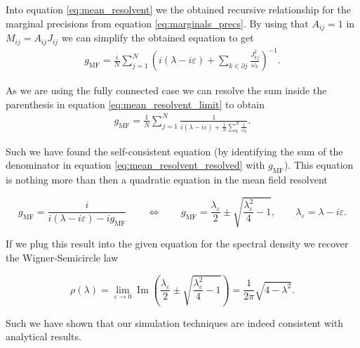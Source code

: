 \documentclass[../main.tex]{subfiles}
\begin{document}
Into equation \eqref{eq:mean_resolvent} we the obtained recursive relationship for the marginal precisions from equation \eqref{eq:marginals_precs}.
By using that $A_{ ij } = 1$ in $M_{ ij } = A_{ ij } J_{ ij } $ we can simplify the obtained equation to get 
\begin{align}
    \label{eq:mean_resolvent_limit}
    g_{ \text{MF} }  = \frac{i}{N} \sum_{j=1}^{N} \left( i(\lambda - i \varepsilon) + \sum_{k \in \partial j}^{} \frac{J^2_{ kj }}{\omega_k} \right)^{-1}
.\end{align}

As we are using the fully connected case we can resolve the sum inside the parenthesis in equation \eqref{eq:mean_resolvent_limit} to obtain 
\begin{align}
    \label{eq:mean_resolvent_resolved}
    g_{ \text{MF} } = \frac{1}{N} \sum_{j=1}^{N} \frac{1}{i(\lambda - i \varepsilon) + \frac{1}{N}\sum\limits_{k}^{N} \frac{1}{\omega_k}}
.\end{align}

Such we have found the self-consistent equation (by identifying the sum of the denominator in equation \eqref{eq:mean_resolvent_resolved} with $g_{ \text{MF} } $).
This equation is nothing more than then a quadratic equation in the mean field resolvent 

\[
    g_{ \text{MF} } = \frac{i}{i(\lambda - i \varepsilon) - i g_{ \text{MF} } }  
    \qquad 
    \Longleftrightarrow
    \qquad
    g_{ \text{MF} } = \frac{\lambda_\varepsilon}{2} \pm \sqrt{\frac{\lambda_\varepsilon^2}{4} - 1}, 
    \qquad
    \lambda_\varepsilon = \lambda - i \varepsilon
.\] 

If we plug this result into the given equation for the spectral density we recover the Wigner-Semicircle law 

\[
    \rho(\lambda) = \lim\limits_{\varepsilon \to 0} \operatorname{Im}\left(\frac{\lambda_\varepsilon}{2} \pm\sqrt{\frac{\lambda_\varepsilon^2}{4} - 1}\right) = \frac{1}{2\pi} \sqrt{4 - \lambda^2} 
.\] 

Such we have shown that our simulation techniques are indeed consistent with analytical results.


\ifSubfilesClassLoaded{
}{
    \newpage
}
\end{document}
